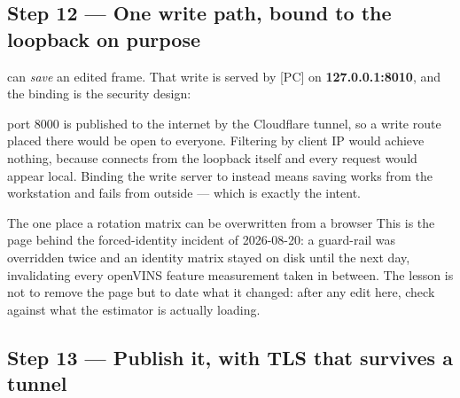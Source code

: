 \subsection{Step 12 --- One write path, bound to the loopback on purpose}
\label{ap:repro-web-write}

 can \emph{save} an edited frame. That write is served
by  [PC] on \textbf{127.0.0.1:8010}, and the
binding is the security design:

port 8000 is published to the internet by the Cloudflare tunnel, so a write
route placed there would be open to everyone. Filtering by client IP would
achieve nothing, because  connects from the loopback itself
and every request would appear local. Binding the write server to
 instead means saving works from the workstation and fails
from outside --- which is exactly the intent.

\begin{trapbox}{The one place a rotation matrix can be overwritten from a browser}
This is the page behind the forced-identity incident of 2026-08-20: a
guard-rail was overridden twice and an identity matrix stayed on disk until
the next day, invalidating every openVINS feature measurement taken in
between. The lesson is not to remove the page but to date what it changed:
after any edit here, check  against what the
estimator is actually loading.
\end{trapbox}

\subsection{Step 13 --- Publish it, with TLS that survives a tunnel}
\label{ap:repro-web-public}

